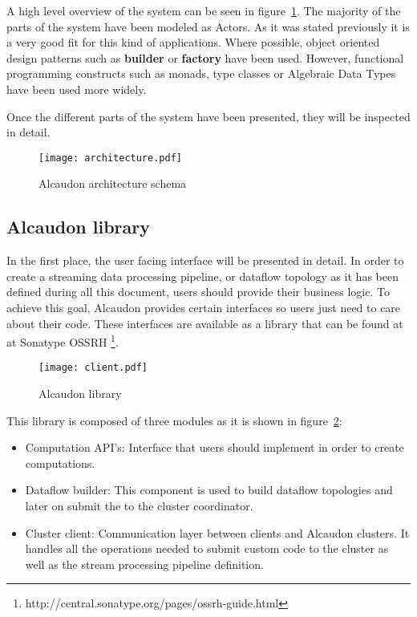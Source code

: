 A high level overview of the system can be seen in
figure~\ref{fig:architecture}. The majority of the parts of the system have been
modeled as Actors. As it was stated previously it is a very good fit for this
kind of applications. Where possible, object oriented design patterns\cite{gof}
such as \textbf{builder} or \textbf{factory} have been used. However, functional
programming constructs such as monads\cite{monads}, type
classes\cite{typeclasses} or Algebraic Data Types have been used more widely.

Once the different parts of the system have been presented, they will be
inspected in detail.

\begin{figure}
  \centering
  \texttt{[image: architecture.pdf]}
  \caption{Alcaudon architecture schema}
  \label{fig:architecture}
\end{figure}

\subsection{Alcaudon library}

In the first place, the user facing interface will be presented in detail. In order
to create a streaming data processing pipeline, or dataflow topology as it has
been defined during all this document, users should provide their business
logic. To achieve this goal, Alcaudon provides certain interfaces so users
just need to care about their code. These interfaces are available as a library
that can be found at at Sonatype OSSRH \footnote{http://central.sonatype.org/pages/ossrh-guide.html}.

\begin{figure}
  \centering
  \texttt{[image: client.pdf]}
  \caption{Alcaudon library}
  \label{fig:library}
\end{figure}

This library is composed of three modules as it is shown in figure~\ref{fig:library}:

\begin{itemize}
\item Computation API's: Interface that users should implement in order to
  create computations.
\item Dataflow builder: This component is used to build dataflow topologies and
  later on submit the to the cluster coordinator.
\item Cluster client: Communication layer between clients and Alcaudon clusters.
  It handles all the operations needed to submit custom code to the cluster as well
  as the stream processing pipeline definition.
\end{itemize}

